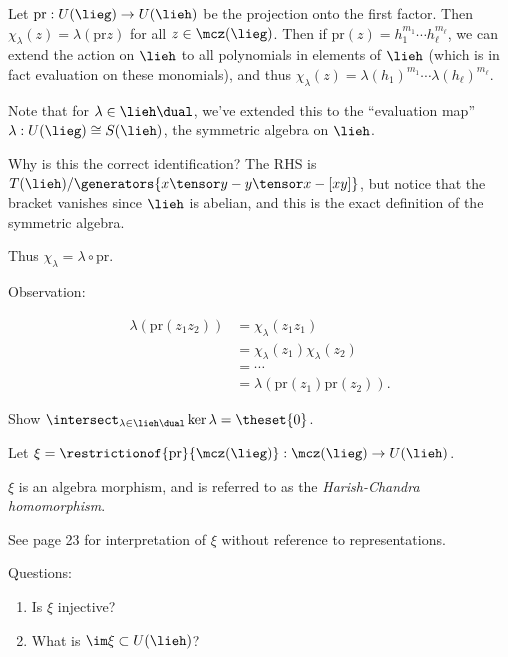Let \(\mathrm{pr}: U(\lieg) \to U(\lieh)\) be the projection onto the
first factor. Then \(\chi_\lambda(z) = \lambda(\mathrm{pr} z)\) for all
\(z\in \mcz(\lieg)\). Then if
\(\mathrm{pr}(z) = h_1^{m_1} \cdots h_\ell^{m_\ell}\), we can extend the
action on \(\lieh\) to all polynomials in elements of \(\lieh\) (which
is in fact evaluation on these monomials), and thus
\(\chi_\lambda(z) = \lambda(h_1)^{m_1} \cdots \lambda(h_\ell)^{m_\ell}\).

Note that for \(\lambda \in \lieh\dual\), we've extended this to the
``evaluation map'' \(\lambda: U(\lieg) \cong S(\lieh)\), the symmetric
algebra on \(\lieh\).

Why is this the correct identification? The RHS is
\(T(\lieh) / \generators{x\tensor y - y\tensor x - [xy]}\), but notice
that the bracket vanishes since \(\lieh\) is abelian, and this is the
exact definition of the symmetric algebra.

Thus \(\chi_\lambda = \lambda \circ \mathrm{pr}\).

Observation:

\begin{align*}
\lambda(\mathrm{pr}(z_1 z_2))
&= \chi_\lambda(z_1 z_1)\\
&= \chi_\lambda(z_1) \chi_\lambda(z_2) \\
&= \cdots \\
&= \lambda( \mathrm{pr}(z_1) \mathrm{pr}(z_2) )
.\end{align*}

\begin{description}
\tightlist
\item[Exercise]
Show \(\intersect_{\lambda \in \lieh\dual} \ker \lambda = \theset{0}\).
\item[Definition (Harish-Chandra Morphism)]
Let
\(\xi = \restrictionof{\mathrm{pr}}{\mcz(\lieg)}: \mcz(\lieg) \to U(\lieh)\).
\item[Definition (Twisted Harish-Chandra Morphism)]
\(\xi\) is an algebra morphism, and is referred to as the
\emph{Harish-Chandra homomorphism}.
\end{description}

See page 23 for interpretation of \(\xi\) without reference to
representations.

Questions:

\begin{enumerate}
\def\labelenumi{\arabic{enumi}.}
\tightlist
\item
  Is \(\xi\) injective?
\item
  What is \(\im \xi \subset U(\lieh)\)?
\end{enumerate}

